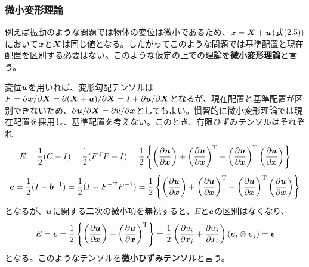 \documentclass[dvipdfmx, 9pt, a4paper]{jsarticle}
\numberwithin{equation}{section}
\newcommand{\bm}[1]{{\mbox{\boldmath $#1$}}}
\begin{document}
\subsubsection{微小変形理論}
例えば振動のような問題では物体の変位は微小であるため、$\bm x=\bm X+\bm u$(式(2.5))において$\bm x$と$\bm X$は同じ値となる。したがってこのような問題では基準配置と現在配置を区別する必要はない。このような仮定の上での理論を{\bf 微小変形理論}と言う。\par
変位$\bm u$を用いれば、変形勾配テンソルは$F=\partial \bm x/\partial \bm X=\partial(\bm X+\bm u)/\partial \bm X=I+\partial \bm u/\partial \bm X$となるが、現在配置と基準配置が区別できないため、$\partial \bm u/\partial \bm X=\partial u/\partial \bm x$としてもよい。慣習的に微小変形理論では現在配置を採用し、基準配置を考えない。このとき、有限ひずみテンソルはそれぞれ
\begin{equation}
E=\frac{1}{2}(C-I)=\frac{1}{2}(F^{\rm T}F-I)=\frac{1}{2}\left\{ \left(\frac{\partial \bm u}{\partial \bm x}\right)+\left(\frac{\partial \bm u}{\partial \bm x}\right)^{\rm T}+\left(\frac{\partial \bm u}{\partial \bm x}\right)^{\rm T}\left(\frac{\partial \bm u}{\partial \bm x}\right)  \right\} \notag
\end{equation}
\begin{equation}
\bm e=\frac{1}{2}(I-\bm b^{-1})=\frac{1}{2}(I - F^{-\rm T}F^{-1})=\frac{1}{2}\left\{ \left(\frac{\partial \bm u}{\partial \bm x}\right)+\left(\frac{\partial \bm u}{\partial \bm x}\right)^{\rm T}-\left(\frac{\partial \bm u}{\partial \bm x}\right)^{\rm T}\left(\frac{\partial \bm u}{\partial \bm x}\right)  \right\} \notag
\end{equation}
となるが、$\bm u$に関する二次の微小項を無視すると、$E$と$\bm e$の区別はなくなり、
\begin{equation}
E=\bm e=\frac{1}{2}\left\{ \left(\frac{\partial \bm u}{\partial \bm x}\right)+\left(\frac{\partial \bm u}{\partial \bm x}\right)^{\rm T} \right\}=\frac{1}{2}\left(\frac{\partial u_i}{\partial x_j}+\frac{\partial u_j}{\partial x_i}\right)(\bm e_i \otimes \bm e_j) = \bm \epsilon
\end{equation}
となる。このようなテンソルを{\bf 微小ひずみテンソル}と言う。
\end{document}
